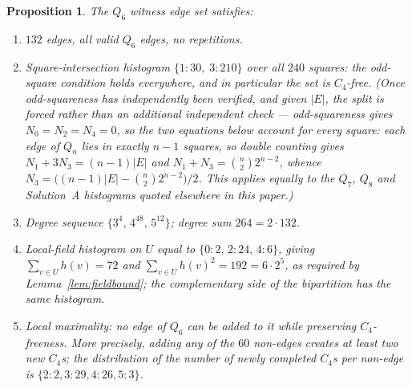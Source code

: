 \documentclass[12pt,a4paper]{article}
\newtheorem{proposition}[theorem]{Proposition}
\theoremstyle{definition}
\begin{document}
\begin{proposition}\label{prop:q6oddsquare}
The $Q_6$ witness edge set satisfies:
\begin{enumerate}[label=(\roman*)]
  \item $132$ edges, all valid $Q_6$ edges, no repetitions.
  \item Square-intersection histogram $\{1\!:\!30,\;3\!:\!210\}$ over all
    $240$ squares: the odd-square condition holds everywhere, and in
    particular the set is $C_4$-free. (Once odd-squareness has independently
    been verified, and given $|E|$, the split is forced rather than an
    additional independent check --- odd-squareness gives
    $N_0=N_2=N_4=0$, so the two equations below account for every
    square: each edge of $Q_n$ lies in
    exactly $n-1$ squares, so double counting gives
    $N_1+3N_3=(n-1)|E|$ and $N_1+N_3=\binom{n}{2}2^{n-2}$, whence
    $N_3=\bigl((n-1)|E|-\binom{n}{2}2^{n-2}\bigr)/2$. This applies equally to
    the $Q_7$, $Q_8$ and Solution~A histograms quoted elsewhere in this paper.)
  \item Degree sequence $\{3^4,\,4^{48},\,5^{12}\}$; degree sum
    $264=2\cdot132$.
  \item Local-field histogram on $U$ equal to
    $\{0\!:\!2,\,2\!:\!24,\,4\!:\!6\}$, giving
    $\sum_{v\in U}h(v)=72$ and $\sum_{v\in U}h(v)^2=192=6\cdot2^5$,
    as required by Lemma~\ref{lem:fieldbound}; the complementary side
    of the bipartition has the same histogram.
  \item Local maximality: no edge of $Q_6$ can be added to it while
    preserving $C_4$-freeness. More precisely, adding any of the $60$
    non-edges creates at least two new $C_4$s; the distribution of the number
    of newly completed $C_4$s per non-edge is
    $\{2{:}2,3{:}29,4{:}26,5{:}3\}$.
\end{enumerate}
\end{proposition}
\end{document}
